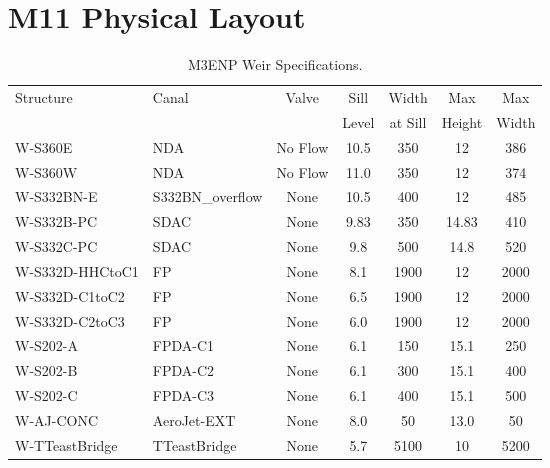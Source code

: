 \section{M11 Physical Layout}

\begin{table}[!h]
\caption{M3ENP Weir Specifications.}
\label{tab:weirs}
\begin{tabular}{llccccc}
\hline
Structure         & Canal            & Valve     & Sill    & Width   & Max   & Max   \\
                  &                  &           & Level   & at Sill & Height& Width \\
\hline
W-S360E           & NDA              & No Flow   &  10.5   & 350     & 12    & 386   \\
W-S360W           & NDA              & No Flow   &  11.0   & 350     & 12    & 374   \\
W-S332BN-E        & S332BN\_overflow & None      &  10.5   & 400     & 12    & 485   \\
W-S332B-PC        & SDAC             & None      &  9.83   & 350     & 14.83 & 410   \\
W-S332C-PC        & SDAC             & None      &  9.8    & 500     & 14.8  & 520   \\
W-S332D-HHCtoC1   & FP               & None      &  8.1    & 1900    & 12    & 2000  \\
W-S332D-C1toC2    & FP               & None      &  6.5    & 1900    & 12    & 2000  \\
W-S332D-C2toC3    & FP               & None      &  6.0    & 1900    & 12    & 2000  \\
W-S202-A          & FPDA-C1          & None      &  6.1    & 150     & 15.1  & 250   \\
W-S202-B          & FPDA-C2          & None      &  6.1    & 300     & 15.1  & 400   \\
W-S202-C          & FPDA-C3          & None      &  6.1    & 400     & 15.1  & 500   \\
W-AJ-CONC         & AeroJet-EXT      & None      &  8.0    & 50      & 13.0  & 50    \\
W-TTeastBridge    & TTeastBridge     & None      &  5.7    & 5100    & 10    & 5200  \\

\end{tabular}
\end{table}
